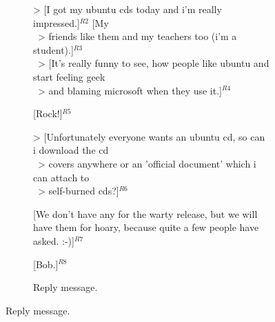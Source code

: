 \begin{figure}
\begin{minipage}{.63\textwidth}
{{\begin{subfigure}[b]{0.9\textwidth}
> [I got my ubuntu cds today and i'm really impressed.]$^{R2}$ [My\\ \ 
> friends like them and my teachers too (i'm a student).]$^{R3}$\\ \ 
> [It's really funny to see, how people like ubuntu and start feeling geek\\ \ 
> and blaming microsoft when they use it.]$^{R4}$\vspace{0.1cm}

[Rock!]$^{R5}$\vspace{0.1cm}

> [Unfortunately everyone wants an ubuntu cd, so can i download the cd\\ \ 
> covers anywhere or an 'official document' which i can attach to\\ \ 
> self-burned cds?]$^{R6}$\vspace{0.1cm}

[We don't have any for the warty release, but we will have them for hoary, %
because quite a few people have asked. :-)]$^{R7}$\vspace{0.1cm}

[Bob.]$^{R8}$ %


                \caption{Reply message.}
                \label{fig:exampleReply}
        \end{subfigure}
}}




\end{minipage}
\end{figure}
